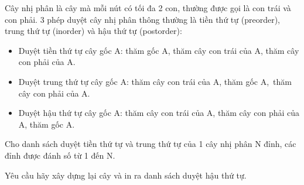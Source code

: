 Cây nhị phân là cây mà mỗi nút có tối đa 2 con, thường được gọi là con trái và con phải. 3 phép duyệt cây nhị phân thông thường là tiền thứ tự (preorder), trung thứ tự (inorder) và hậu thứ tự (postorder):
\begin{itemize}
	\item Duyệt tiền thứ tự cây gốc A: thăm gốc A, thăm cây con trái của A, thăm cây con phải của A.
	\item Duyệt trung thứ tự cây gốc A: thăm cây con trái của A, thăm gốc A, thăm cây con phải của A.
	\item Duyệt hậu thứ tự cây gốc A: thăm cây con trái của A, thăm cây con phải của A, thăm gốc A.
\end{itemize}

Cho danh sách duyệt tiền thứ tự và trung thứ tự của 1 cây nhị phân N đỉnh, các đỉnh được đánh số từ 1 đến N.

Yêu cầu hãy xây dựng lại cây và in ra danh sách duyệt hậu thứ tự.

\